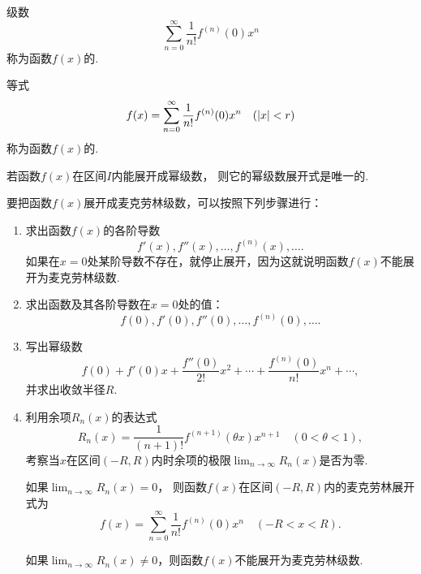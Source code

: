 \begin{definition}
级数\begin{equation*}
	\sum_{n=0}^\infty \frac{1}{n!} f^{(n)}(0) x^n
\end{equation*}
称为函数\(f(x)\)的.

等式\begin{equation*}
	f(x) = \sum_{n=0}^\infty {\frac{1}{n!} f^{(n)}(0) x^n}
	\quad(\abs{x} < r)
\end{equation*}
称为函数\(f(x)\)的.
\end{definition}

\begin{theorem}
若函数\(f(x)\)在区间\(I\)内能展开成幂级数，
则它的幂级数展开式是唯一的.
\end{theorem}

{\color{red}
要把函数\(f(x)\)展开成麦克劳林级数，可以按照下列步骤进行：
\begin{enumerate}
	\item 求出函数\(f(x)\)的各阶导数\begin{equation*}
		f'(x),f''(x),\dotsc,f^{(n)}(x),\dotsc.
	\end{equation*}
	如果在\(x=0\)处某阶导数不存在，就停止展开，因为这就说明函数\(f(x)\)不能展开为麦克劳林级数.

	\item 求出函数及其各阶导数在\(x=0\)处的值：\begin{equation*}
		f(0),f'(0),f''(0),\dotsc,f^{(n)}(0),\dotsc.
	\end{equation*}

	\item 写出幂级数\begin{equation*}
		f(0) + f'(0) x + \frac{f''(0)}{2!} x^2 + \dotsb + \frac{f^{(n)}(0)}{n!} x^n + \dotsb,
	\end{equation*}
	并求出收敛半径\(R\).

	\item 利用余项\(R_n(x)\)的表达式\begin{equation*}
		R_n(x) = \frac{1}{(n+1)!} f^{(n+1)}(\theta x) x^{n+1}
		\quad(0 < \theta < 1),
	\end{equation*}
	考察当\(x\)在区间\((-R,R)\)内时余项的极限\(\lim_{n\to\infty} R_n(x)\)是否为零.

	如果\(\lim_{n\to\infty} R_n(x) = 0\)，
	则函数\(f(x)\)在区间\((-R,R)\)内的麦克劳林展开式为\begin{equation*}
		f(x) = \sum_{n=0}^\infty \frac{1}{n!} f^{(n)}(0) x^n
		\quad(-R < x < R).
	\end{equation*}

	如果\(\lim_{n\to\infty} R_n(x) \neq 0\)，则函数\(f(x)\)不能展开为麦克劳林级数.
\end{enumerate}
}

